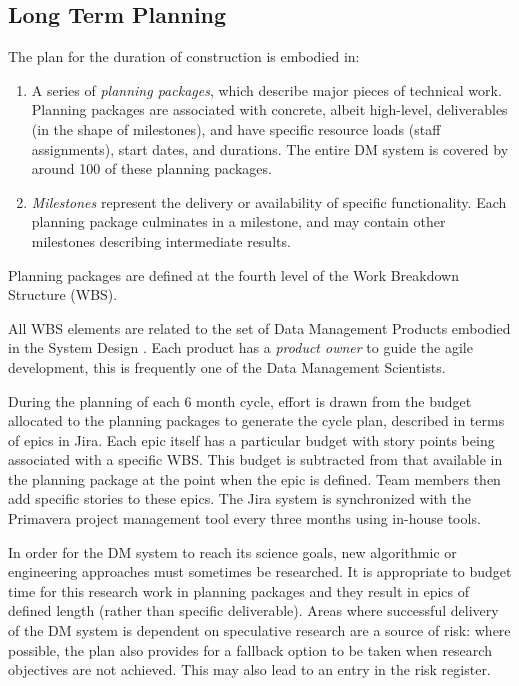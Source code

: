 \subsection{Long Term Planning}
\label{sec:long-term-plan}

The plan for the duration of construction is embodied in:

\begin{enumerate}
\item
  A series of \emph{planning packages}, which describe major pieces of
  technical work. Planning packages are associated with concrete, albeit
  high-level, deliverables (in the shape of milestones), and have
  specific resource loads (staff assignments), start dates, and
  durations. The entire DM system is covered by around 100 of these
  planning packages.
\item
  \emph{Milestones} represent the delivery or availability of specific
  functionality. Each planning package culminates in a milestone, and
  may contain other milestones describing intermediate results.
\end{enumerate}

Planning packages are defined at the fourth level of the Work Breakdown Structure (WBS).

All WBS elements are related to the set of Data Management Products embodied in the System Design \cite{LDM-148}.
Each product has a \emph{product owner} to guide the agile development, this is frequently one of the Data Management Scientists.

During the planning of each 6 month cycle, effort is drawn from the budget allocated to the planning packages to generate the cycle plan, described in terms of epics in Jira.
Each epic itself has a particular budget with story points being associated with a specific WBS.
This budget is subtracted from that available in the planning package at the point when the epic is defined.
Team members then add specific stories to these epics.
The Jira system is synchronized with the Primavera project management tool every three months using in-house tools.

In order for the DM system to reach its science goals, new algorithmic or engineering approaches must sometimes be researched.
It is appropriate to budget time for this research work in planning packages and they result in epics of defined length (rather than specific  deliverable).
Areas where successful delivery of the DM system is dependent on speculative research are a source of risk: where possible, the plan  also provides for a fallback option to be taken when research objectives are not achieved.
This may also lead to an entry in the risk register.\cite{2016SPIE.9911E..0NK}


